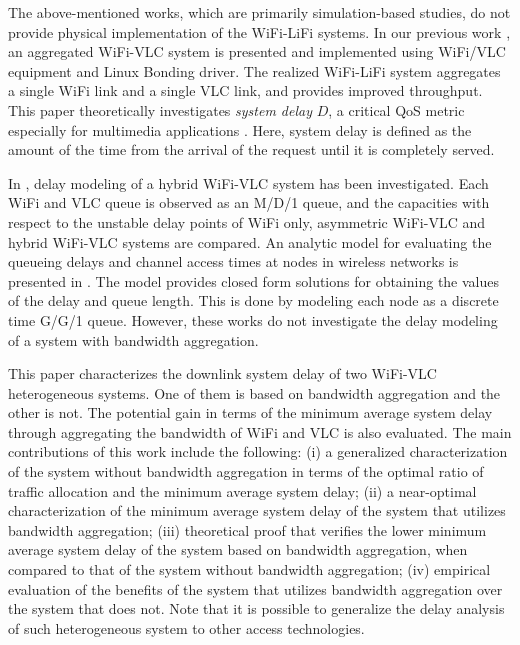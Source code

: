 \documentclass[10pt,journal]{IEEEtran}
\begin{document}
The above-mentioned works, which are primarily simulation-based studies, do not provide physical implementation of the WiFi-LiFi systems. In our previous work \cite{ShaoJOCN2015}, an aggregated WiFi-VLC system is presented and implemented using WiFi/VLC equipment and Linux Bonding driver. The realized WiFi-LiFi system aggregates a single WiFi link and a single VLC link, and provides improved throughput. This paper theoretically investigates {\it system delay} $D$, a critical QoS metric especially for multimedia applications \cite{rahaim2011hybrid}. Here, system delay is defined as the amount of the time from the arrival of the request until it is completely served.

In \cite{rahaim2011hybrid}, delay modeling of a hybrid WiFi-VLC system has been investigated. Each WiFi and VLC queue is observed as an M/D/1 queue, and the capacities with respect to the unstable delay points of WiFi only, asymmetric WiFi-VLC and hybrid WiFi-VLC systems are compared. An analytic model for evaluating the queueing delays and channel access times at nodes in wireless networks is presented in \cite{tickoo2008modeling}. The model provides closed form solutions for obtaining the values of the delay and queue length. This is done by modeling each node as a discrete time G/G/1 queue. However, these works do not investigate the delay modeling of a system with bandwidth aggregation.


This paper characterizes the downlink system delay of two WiFi-VLC heterogeneous systems. One of them is based on bandwidth aggregation and the other is not. The potential gain in terms of the minimum average system delay through aggregating the bandwidth of WiFi and VLC is also evaluated. The main contributions of this work include the following: (i) a generalized characterization of the system without bandwidth aggregation in terms of the optimal ratio of traffic allocation and the minimum average system delay; (ii) a near-optimal characterization of the minimum average system delay of the system that utilizes bandwidth aggregation; (iii) theoretical proof that verifies the lower minimum average system delay of the system based on bandwidth aggregation, when compared to that of the system without bandwidth aggregation; (iv) empirical evaluation of the benefits of the system that utilizes bandwidth aggregation over the system that does not. Note that it is possible to generalize the delay analysis of such heterogeneous system to other access technologies.
\end{document}
